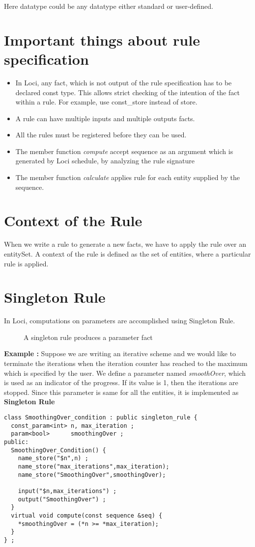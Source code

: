 \par Here datatype could be any datatype either standard or user-defined.

\section { Important things about rule specification }
\begin{itemize}
\item In Loci, any fact, which is not output of the rule specification
has to be declared const type. This allows strict checking of the intention of the fact
within a rule. For example, use const\_store instead of store.
%
\item A rule can have multiple inputs and multiple outputs facts.
%
\item All the rules must be registered before they can be used. 
%
\item The member function {\em compute} accept sequence as an 
argument which is generated by Loci schedule, by analyzing the rule signature 
%
\item The member function {\em calculate} applies rule for each entity
supplied by the sequence.
\end{itemize}
%
\section {Context of the Rule}
When we write a rule to generate a new facts, we have to apply the rule over an 
entitySet.  A context of the rule is defined as the set of entities, where a particular 
rule is applied.  
%
\section { Singleton Rule }
In Loci, computations on parameters are accomplished using Singleton Rule.
%
\begin{figure}[h]
\vspace{3.50in}\caption { A singleton rule produces a parameter fact}
\label {FigLocalReduction}
\end{figure}
%
\par {\bf Example :} Suppose we are writing an iterative scheme and we 
would like to terminate the iterations when the iteration counter has
reached to the maximum which is specified by the user. We define a parameter named 
{\em smoothOver}, which is used as an indicator of the progress. If its value is 1, then the
iterations are stopped. Since this parameter is same for all the entities,
it is implemented as {\bf Singleton Rule }
\begin{verbatim}
class SmoothingOver_condition : public singleton_rule {
  const_param<int> n, max_iteration ;
  param<bool>      smoothingOver ;
public:
  SmoothingOver_Condition() {
    name_store("$n",n) ;
    name_store("max_iterations",max_iteration);
    name_store("SmoothingOver",smoothingOver);
    
    input("$n,max_iterations") ;
    output("SmoothingOver") ;
  }
  virtual void compute(const sequence &seq) {
    *smoothingOver = (*n >= *max_iteration);
  }
} ;
\end{verbatim}

